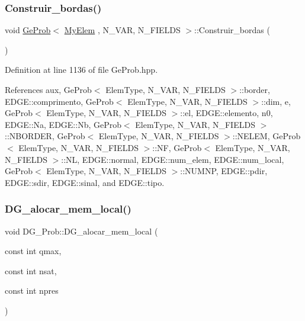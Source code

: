 \subsubsection{\texorpdfstring{Construir\+\_\+bordas()}{Construir\_bordas()}}
{\footnotesize\ttfamily void \hyperlink{classGeProb}{Ge\+Prob}$<$ \hyperlink{DG__Prob_8h_a83cd887ced9a6587428f267e50cd4787}{My\+Elem} , N\+\_\+\+V\+AR, N\+\_\+\+F\+I\+E\+L\+DS $>$\+::Construir\+\_\+bordas (\begin{DoxyParamCaption}{ }\end{DoxyParamCaption})\hspace{0.3cm}{\ttfamily [inherited]}}



Definition at line 1136 of file Ge\+Prob.\+hpp.



References aux, Ge\+Prob$<$ Elem\+Type, N\+\_\+\+V\+A\+R, N\+\_\+\+F\+I\+E\+L\+D\+S $>$\+::border, E\+D\+G\+E\+::comprimento, Ge\+Prob$<$ Elem\+Type, N\+\_\+\+V\+A\+R, N\+\_\+\+F\+I\+E\+L\+D\+S $>$\+::dim, e, Ge\+Prob$<$ Elem\+Type, N\+\_\+\+V\+A\+R, N\+\_\+\+F\+I\+E\+L\+D\+S $>$\+::el, E\+D\+G\+E\+::elemento, n0, E\+D\+G\+E\+::\+Na, E\+D\+G\+E\+::\+Nb, Ge\+Prob$<$ Elem\+Type, N\+\_\+\+V\+A\+R, N\+\_\+\+F\+I\+E\+L\+D\+S $>$\+::\+N\+B\+O\+R\+D\+ER, Ge\+Prob$<$ Elem\+Type, N\+\_\+\+V\+A\+R, N\+\_\+\+F\+I\+E\+L\+D\+S $>$\+::\+N\+E\+L\+EM, Ge\+Prob$<$ Elem\+Type, N\+\_\+\+V\+A\+R, N\+\_\+\+F\+I\+E\+L\+D\+S $>$\+::\+NF, Ge\+Prob$<$ Elem\+Type, N\+\_\+\+V\+A\+R, N\+\_\+\+F\+I\+E\+L\+D\+S $>$\+::\+NL, E\+D\+G\+E\+::normal, E\+D\+G\+E\+::num\+\_\+elem, E\+D\+G\+E\+::num\+\_\+local, Ge\+Prob$<$ Elem\+Type, N\+\_\+\+V\+A\+R, N\+\_\+\+F\+I\+E\+L\+D\+S $>$\+::\+N\+U\+M\+NP, E\+D\+G\+E\+::pdir, E\+D\+G\+E\+::sdir, E\+D\+G\+E\+::sinal, and E\+D\+G\+E\+::tipo.

\mbox{\label{classDG__Prob_a646bbb0fd2786395486c09b1aa6b2653}} 
\subsubsection{\texorpdfstring{D\+G\+\_\+alocar\+\_\+mem\+\_\+local()}{DG\_alocar\_mem\_local()}}
{\footnotesize\ttfamily void D\+G\+\_\+\+Prob\+::\+D\+G\+\_\+alocar\+\_\+mem\+\_\+local (\begin{DoxyParamCaption}\item[{const int}]{qmax,  }\item[{const int}]{nsat,  }\item[{const int}]{npres }\end{DoxyParamCaption})}



